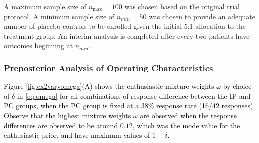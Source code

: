 \documentclass[12pt]{article}
\begin{document}

A maximum sample size of $n_{\text{max}}=100$ was chosen based on the original trial protocol.
%
A minimum sample size of $n_{min}=50$ was chosen to provide an adequate number of placebo controls to be enrolled given the initial 5:1 allocation to the treatment group.
%
An interim analysis is completed after every two patients have outcomes beginning at $n_{min}$.

\subsubsection{Preposterior Analysis of Operating Characteristics}\label{sec:ex2operatingcharacteristics} 
\textcolor{black}{Figure \ref{fig:ex2varyomega}(A) shows the enthusiastic mixture weights $\omega$ by choice of $\delta$ in \eqref{eq:omega} for all combinations of response difference between the IP and PC groups, when the PC group is fixed at a 38\% response rate (16/42 responses). Observe that the highest mixture weights $\omega$ are observed when the response differences are observed to be around $0.12$, which was the mode value for the enthusiastic prior, and have maximum values of $1-\delta$.}
\end{document}
